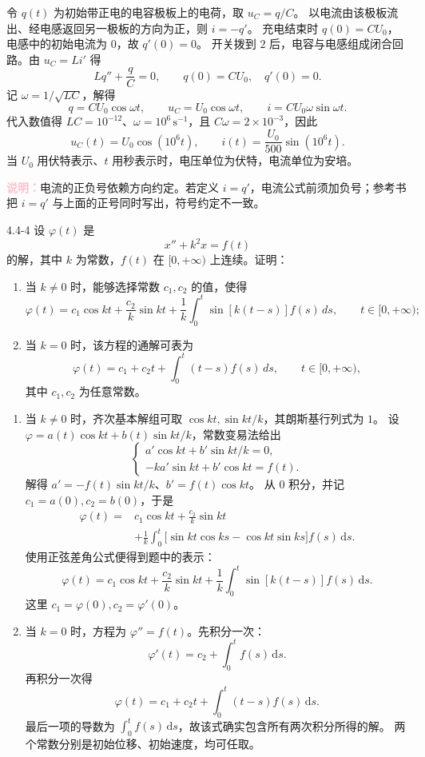\documentclass[UTF8,a4paper,11pt]{ctexart}
\newcommand{\dd}{\,\mathrm d}
\newcommand{\note}[1]{\par\smallskip\noindent\textcolor{pink}{\bfseries 说明：}#1\par\smallskip}
\begin{document}
\begin{solution}
令 $q(t)$ 为初始带正电的电容极板上的电荷，取 $u_C=q/C$。
以电流由该极板流出、经电感返回另一极板的方向为正，则 $i=-q'$。
充电结束时 $q(0)=CU_0$，电感中的初始电流为 $0$，故 $q'(0)=0$。
开关拨到 $2$ 后，电容与电感组成闭合回路。由
$u_C=L i'$ 得
\[
Lq''+\frac qC=0,\qquad q(0)=CU_0,\quad q'(0)=0.
\]
记 $\omega=1/\sqrt{LC}$，解得
\[
q=CU_0\cos\omega t,\qquad
u_C=U_0\cos\omega t,\qquad
i=CU_0\omega\sin\omega t.
\]
代入数值得 $LC=10^{-12}$、$\omega=10^6\,\mathrm{s^{-1}}$，且 $C\omega=2\times10^{-3}$，因此
\[
\boxed{u_C(t)=U_0\cos(10^6t),\qquad
i(t)=\frac{U_0}{500}\sin(10^6t).}
\]
当 $U_0$ 用伏特表示、$t$ 用秒表示时，电压单位为伏特，电流单位为安培。
\note{电流的正负号依赖方向约定。若定义 $i=q'$，电流公式前须加负号；参考书把 $i=q'$ 与上面的正号同时写出，符号约定不一致。}
\end{solution}

\begin{problem}{4.4-4}
设 $\varphi(t)$ 是
  \[
    x''+k^2x=f(t)
  \]
  的解，其中 $k$ 为常数，$f(t)$ 在 $[0,+\infty)$ 上连续。证明：
  \begin{enumerate}[label=(\arabic*)]
    \item 当 $k\ne0$ 时，能够选择常数 $c_1,c_2$ 的值，使得
    \[
      \varphi(t)
      =c_1\cos kt+\frac{c_2}{k}\sin kt
      +\frac{1}{k}\int_0^t\sin[k(t-s)]f(s)\,ds,
      \qquad t\in[0,+\infty);
    \]
    \item 当 $k=0$ 时，该方程的通解可表为
    \[
      \varphi(t)=c_1+c_2t+\int_0^t(t-s)f(s)\,ds,
      \qquad t\in[0,+\infty),
    \]
    其中 $c_1,c_2$ 为任意常数。
  \end{enumerate}
\end{problem}

\begin{solution}
\begin{enumerate}[label=(\arabic*)]
\item 当 $k\ne0$ 时，齐次基本解组可取 $\cos kt,\sin kt/k$，其朗斯基行列式为 $1$。
设 $\varphi=a(t)\cos kt+b(t)\sin kt/k$，常数变易法给出
\[
\begin{cases}
a'\cos kt+b'\sin kt/k=0,\\
-ka'\sin kt+b'\cos kt=f(t).
\end{cases}
\]
解得 $a'=-f(t)\sin kt/k$、$b'=f(t)\cos kt$。
从 $0$ 积分，并记 $c_1=a(0),c_2=b(0)$，于是
\[
\begin{aligned}
\varphi(t)={}&c_1\cos kt+\frac{c_2}{k}\sin kt\\
&+\frac1k\int_0^t
\bigl[\sin kt\cos ks-\cos kt\sin ks\bigr]f(s)\dd s.
\end{aligned}
\]
使用正弦差角公式便得到题中的表示：
\[
\boxed{\varphi(t)=c_1\cos kt+\frac{c_2}{k}\sin kt
+\frac1k\int_0^t\sin[k(t-s)]f(s)\dd s.}
\]
这里 $c_1=\varphi(0),c_2=\varphi'(0)$。

\item 当 $k=0$ 时，方程为 $\varphi''=f(t)$。先积分一次：
\[
\varphi'(t)=c_2+\int_0^tf(s)\dd s.
\]
再积分一次得
\[
\boxed{\varphi(t)=c_1+c_2t+\int_0^t(t-s)f(s)\dd s.}
\]
最后一项的导数为 $\int_0^tf(s)\dd s$，故该式确实包含所有两次积分所得的解。
两个常数分别是初始位移、初始速度，均可任取。
\end{enumerate}
\end{solution}
\end{document}
